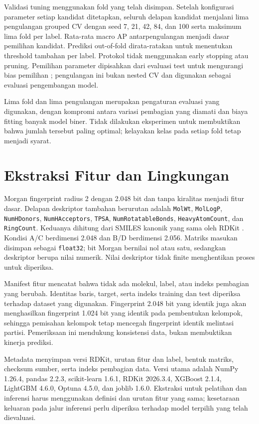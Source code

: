 Validasi tuning menggunakan fold yang telah disimpan. Setelah konfigurasi parameter setiap kandidat ditetapkan, seluruh delapan kandidat menjalani lima pengulangan grouped CV dengan seed 7, 21, 42, 84, dan 100 serta maksimum lima fold per label. Rata-rata macro AP antarpengulangan menjadi dasar pemilihan kandidat. Prediksi out-of-fold dirata-ratakan untuk menentukan threshold tambahan per label. Protokol tidak menggunakan early stopping atau pruning. Pemilihan parameter dipisahkan dari evaluasi test untuk mengurangi bias pemilihan \cite{cawley2010}; pengulangan ini bukan nested CV dan digunakan sebagai evaluasi pengembangan model.

Lima fold dan lima pengulangan merupakan pengaturan evaluasi yang digunakan, dengan kompromi antara variasi pembagian yang diamati dan biaya fitting banyak model biner. Tidak dilakukan eksperimen untuk membuktikan bahwa jumlah tersebut paling optimal; kelayakan kelas pada setiap fold tetap menjadi syarat.

\section{Ekstraksi Fitur dan Lingkungan}
Morgan fingerprint radius 2 dengan 2.048 bit dan tanpa kiralitas menjadi fitur dasar. Delapan deskriptor tambahan berurutan adalah \texttt{MolWt}, \texttt{MolLogP}, \texttt{NumHDonors}, \texttt{NumHAcceptors}, \texttt{TPSA}, \texttt{NumRotatableBonds}, \texttt{HeavyAtomCount}, dan \texttt{RingCount}. Keduanya dihitung dari SMILES kanonik yang sama oleh RDKit \cite{rdkitgenerator2026,rdkitdescriptors2026}. Kondisi A/C berdimensi 2.048 dan B/D berdimensi 2.056. Matriks masukan disimpan sebagai \texttt{float32}; bit Morgan bernilai nol atau satu, sedangkan deskriptor berupa nilai numerik. Nilai deskriptor tidak finite menghentikan proses untuk diperiksa.

Manifest fitur mencatat bahwa tidak ada molekul, label, atau indeks pembagian yang berubah. Identitas baris, target, serta indeks training dan test diperiksa terhadap dataset yang digunakan. Fingerprint 2.048 bit yang identik juga akan menghasilkan fingerprint 1.024 bit yang identik pada pembentukan kelompok, sehingga pemisahan kelompok tetap mencegah fingerprint identik melintasi partisi. Pemeriksaan ini mendukung konsistensi data, bukan membuktikan kinerja prediksi.

Metadata menyimpan versi RDKit, urutan fitur dan label, bentuk matriks, checksum sumber, serta indeks pembagian data. Versi utama adalah NumPy 1.26.4, pandas 2.2.3, scikit-learn 1.6.1, RDKit 2026.3.4, XGBoost 2.1.4, LightGBM 4.6.0, Optuna 4.5.0, dan joblib 1.6.0. Ekstraksi untuk pelatihan dan inferensi harus menggunakan definisi dan urutan fitur yang sama; kesetaraan keluaran pada jalur inferensi perlu diperiksa terhadap model terpilih yang telah dievaluasi.


